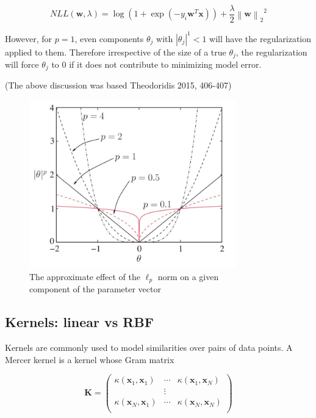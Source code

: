 \documentclass[letterpaper, 11pt]{article}
\newcommand{\norm}[1]{\left\lVert #1 \right\rVert}
\newcommand{\vect}[1]{\boldsymbol{#1}}
\begin{document}
\begin{equation*}
  NLL(\vect{w}, \lambda) = \log(1 + \exp(-y_i \vect{w}^T\vect{x})) + \frac{\lambda}{2} {\norm{\vect{w}}_2}^2
\end{equation*}

However, for $p = 1$, even components $\theta_j$ with $|\theta_j|^1 < 1$ will have the regularization applied to them. Therefore irrespective of the size of a true $\theta_j$, the regularization will force $\theta_j$ to 0 if it does not contribute to minimizing model error.

(The above discussion was based Theodoridis 2015, 406-407)

\begin{figure}[ht!]
\centering
\includegraphics[width=90mm]{figure1.jpg}
\caption{The approximate effect of the $\ell_p$ norm on a given\\ component of the parameter vector \label{overflow}}
\end{figure}

\subsection{Kernels: linear vs RBF}

Kernels are commonly used to model similarities over pairs of data points. A Mercer kernel is a kernel whose Gram matrix

\begin{equation*}
  \vect{K} = \begin{pmatrix}
    \kappa(\vect{x}_1, \vect{x}_1) & \cdots & \kappa(\vect{x}_1, \vect{x}_N) \\
    & \vdots & \\
    \kappa(\vect{x}_N, \vect{x}_1) & \cdots & \kappa(\vect{x}_N, \vect{x}_N) \\    
  \end{pmatrix}
\end{equation*}
\end{document}
